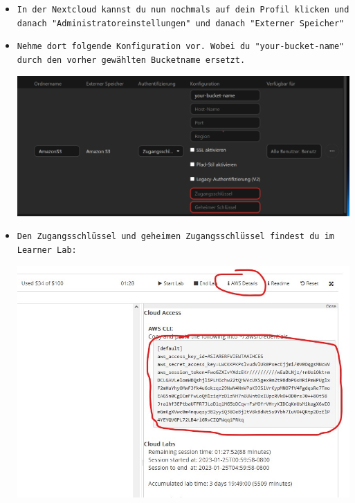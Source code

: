 \documentclass{article}
\begin{document}
\begin{itemize}
\item \texttt{In der Nextcloud kannst du nun nochmals auf dein Profil klicken und danach "Administratoreinstellungen" und danach "Externer Speicher"} \\

\item \texttt{Nehme dort folgende Konfiguration vor. Wobei du "your-bucket-name" durch den vorher gewählten Bucketname ersetzt.
} \\

\begin{center}
    \includegraphics[width=13cm]{images/nextcloud_5.png}
\end{center}

\clearpage

\item \texttt{Den Zugangsschlüssel und geheimen Zugangsschlüssel findest du im Learner Lab:
} \\

\begin{center}
    \includegraphics[width=13cm]{images/wordpress_2.jpg}
\end{center}

\end{itemize}
\end{document}
